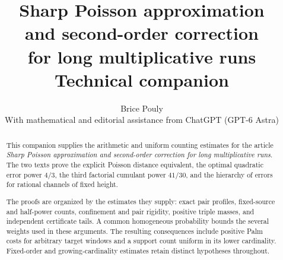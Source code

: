 \documentclass[11pt,a4paper]{article}
\title{\bfseries Sharp Poisson approximation\\and second-order correction\\for long multiplicative runs\\[9pt]\large Technical companion}
\author{Brice Pouly\\[5pt]
 \small With mathematical and editorial assistance from ChatGPT (GPT-6 Astra)}
\date{}
\begin{document}
\maketitle
\thispagestyle{plain}
\begin{abstract}
This companion supplies the arithmetic and uniform counting estimates
for the article \emph{Sharp Poisson approximation and second-order
correction for long multiplicative runs}. The two texts prove the
explicit Poisson distance equivalent, the optimal quadratic error
power $4/3$, the third factorial cumulant power $41/30$, and the
hierarchy of errors for rational channels of fixed height.

The proofs are organized by the estimates they supply: exact pair
profiles, fixed-source and half-power counts, confinement and pair
rigidity, positive triple masses, and independent certificate tails.
A common homogeneous probability bounds the several weights used
in these arguments. The resulting consequences include positive Palm
costs for arbitrary target windows and a support count uniform in
its lower cardinality. Fixed-order and growing-cardinality estimates
retain distinct hypotheses throughout.
\end{abstract}
\clearpage
\begingroup
\small
\setlength{\parskip}{0pt}
\tableofcontents
\endgroup
\clearpage



















\end{document}
